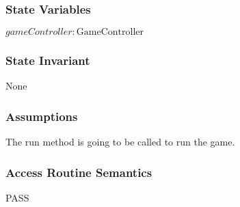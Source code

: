 \documentclass[12pt]{article}
\begin{document}
\subsubsection* {State Variables}

$gameController: \text{GameController}$\\

\subsubsection* {State Invariant}

None

\subsubsection* {Assumptions}

The run method is going to be called to run the game.

\subsubsection* {Access Routine Semantics}

PASS

\newpage
\end{document}
